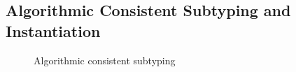 \subsection{Algorithmic Consistent Subtyping and Instantiation}
\label{sec:algo:subtype}

\begin{figure}[t]
  \centering
  \begin{small}

  \end{small}
  \caption{Algorithmic consistent subtyping}
  \label{fig:algo:subtype}
\end{figure}

